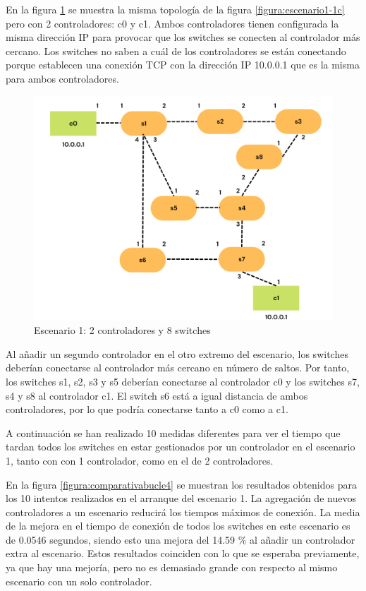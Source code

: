 \documentclass[a4paper, 12pt]{book}
\begin{document}
 	En la figura \ref{figura:escenario1-2c} se muestra la misma topología de la figura \ref{figura:escenario1-1c} pero con 2 controladores: c0 y c1. Ambos controladores tienen configurada la misma dirección IP para provocar que los switches se conecten al controlador más cercano. Los switches no saben a cuál de los controladores se están conectando porque establecen una conexión TCP con la dirección IP 10.0.0.1 que es la misma para ambos controladores.
 	
 	\begin{figure}[H]
 		\centering
 		\includegraphics[width=12cm, keepaspectratio]{img/escenario1-2}
 		\caption{Escenario 1: 2 controladores y 8 switches}
 		\label{figura:escenario1-2c}
 		\vspace{-18pt}
 	\end{figure}
 	
 	 Al añadir un segundo controlador en el otro extremo del escenario, los switches deberían conectarse al controlador más cercano en número de saltos. Por tanto, los switches	 s1, s2, s3 y s5 deberían conectarse al controlador c0 y los switches s7, s4 y s8 al controlador c1. El switch
 	 s6 está a igual distancia de ambos controladores, por lo que podría conectarse tanto a c0 como a c1.
 	 
 	 A continuación se han realizado 10 medidas diferentes para ver el tiempo que tardan todos los switches en estar gestionados por un controlador en el escenario 1, tanto con con 1 controlador, como en el de 2 controladores.
 	
 En la figura \ref{figura:comparativabucle4} se muestran los resultados obtenidos para los 10 intentos realizados en el arranque del escenario 1. La agregación de nuevos controladores a un escenario reducirá los tiempos máximos de conexión. La media de la mejora en el tiempo de conexión de todos los switches en este escenario es de 0.0546 segundos, siendo esto una mejora del 14.59 \% al añadir un controlador extra al escenario. 
 	Estos resultados coinciden con lo que se esperaba previamente, ya que hay una mejoría, pero no es demasiado grande con respecto al mismo escenario con un solo controlador.
 	
\end{document}

